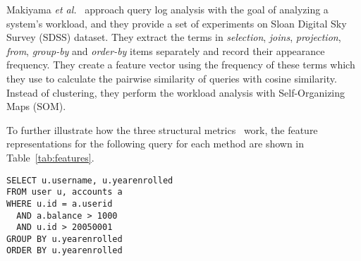 Makiyama \textit{et al.}~\cite{makiyama2015text} approach query log analysis with the goal of analyzing a system's workload, and they provide a set of experiments on Sloan Digital Sky Survey (SDSS) dataset.
They extract the terms in \textit{selection}, \textit{joins}, \textit{projection}, \textit{from}, \textit{group-by} and \textit{order-by} items separately and record their appearance frequency.
They create a feature vector using the frequency of these terms which they use to calculate the pairwise similarity of queries with cosine similarity.
Instead of clustering, they perform the workload analysis with Self-Organizing Maps (SOM).

To further illustrate how the three structural metrics~\cite{aouiche2006, aligon2014similarity, makiyama2015text} work, the feature representations for the following query for each method are shown in Table~\ref{tab:features}.
{\footnotesize
\begin{verbatim}
SELECT u.username, u.yearenrolled
FROM user u, accounts a
WHERE u.id = a.userid
  AND a.balance > 1000
  AND u.id > 20050001
GROUP BY u.yearenrolled
ORDER BY u.yearenrolled
\end{verbatim}
}

